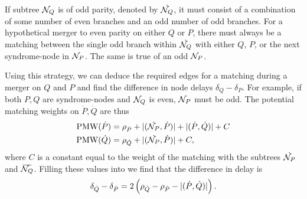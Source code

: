 If subtree $\mathcal{N}_Q$ is of odd parity, denoted by $\dot{\mathcal{N}_Q}$, it must consist of a combination of some number of even branches and an odd number of odd branches. For a hypothetical merger to even parity on either $Q$ or $P$, there must always be a matching between the single odd branch within $\dot{\mathcal{N}_Q}$ with either $Q$, $P$, or the next syndrome-node in $\mathcal{N}_P$. The same is true of an odd $\mathcal{N}_P$.

Using this strategy, we can deduce the required edges for a matching during a merger on $Q$ and $P$ and find the difference in node delays $\delta_Q - \delta_P$. For example, if both $P,Q$ are syndrome-nodes and $\mathcal{N}_Q$ is even, $\mathcal{N}_P$ must be odd. The potential matching weights on $\dot{P},\dot{Q}$ are thus
\begin{align*}
  \text{PMW}(\dot{P}) &= \rho_{\dot{P}} + \lvert(\dot{\mathcal{N}_P},\dot{P})\rvert + \lvert(\dot{P}, \dot{Q})\rvert + C \\
  \text{PMW}(\dot{Q}) &= \rho_{\dot{Q}} + \lvert(\dot{\mathcal{N}_P},\dot{P})\rvert + C,
\end{align*}
where $C$ is a constant equal to the weight of the matching with the subtrees $\dot{\mathcal{N}_P}$ and $\overbar{\nset_Q}$. Filling these values into  we find that the difference in delay is 
\begin{equation*}
  \delta_{\dot{Q}} - \delta_{\dot{P}} = 2\left(\rho_{\dot{Q}} - \rho_{\dot{P}} - \lvert(\dot{P}, \dot{Q})\rvert\right).
\end{equation*}

